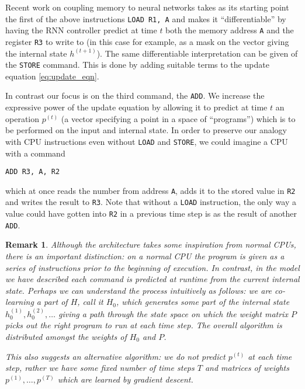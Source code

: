 \documentclass[english,letter paper,12pt,leqno]{article}
\theoremstyle{example}
\newtheorem{remark}[theorem]{Remark}
\numberwithin{equation}{section}
\begin{document}
Recent work \cite{??,??} on coupling memory to neural networks takes as its starting point the first of the above instructions \verb+LOAD R1, A+ and makes it ``differentiable'' by having the RNN controller predict at time $t$ both the memory address \verb+A+ and the register \verb+R3+ to write to (in this case for example, as a mask on the vector giving the internal state $h^{(t+1)}$). The same differentiable interpretation can be given of the \verb+STORE+ command. This is done by adding suitable terms to the update equation \eqref{eq:update_eqn}.

In contrast our focus is on the third command, the \verb+ADD+. We increase the expressive power of the update equation by allowing it to predict at time $t$ an operation $p^{(t)}$ (a vector specifying a point in a space of ``programs'') which is to be performed on the input and internal state. In order to preserve our analogy with CPU instructions even without \verb+LOAD+ and \verb+STORE+, we could imagine a CPU with a command
\begin{verbatim}
ADD R3, A, R2
\end{verbatim}
which at once reads the number from address \verb+A+, adds it to the stored value in \verb+R2+ and writes the result to \verb+R3+. Note that without a \verb+LOAD+ instruction, the only way a value could have gotten into \verb+R2+ in a previous time step is as the result of another \verb+ADD+.

\begin{remark} Although the architecture takes some inspiration from normal CPUs, there is an important distinction: on a normal CPU the program is given as a series of instructions prior to the beginning of execution. In contrast, in the model we have described each command is \emph{predicted} at runtime from the current internal state. Perhaps we can understand the process intuitively as follows: we are co-learning a part of $H$, call it $H_0$, which generates some part of the internal state $h^{(1)}_{0}, h^{(2)}_{0}, \ldots$ giving a path through the state space on which the weight matrix $P$ picks out the right program to run at each time step. The overall algorithm is distributed amongst the weights of $H_0$ and $P$.

This also suggests an alternative algorithm: we do not predict $p^{(t)}$ at each time step, rather we have some fixed number of time steps $T$ and matrices of weights $p^{(1)}, \ldots, p^{(T)}$ which are learned by gradient descent.
\end{remark}
\end{document}

